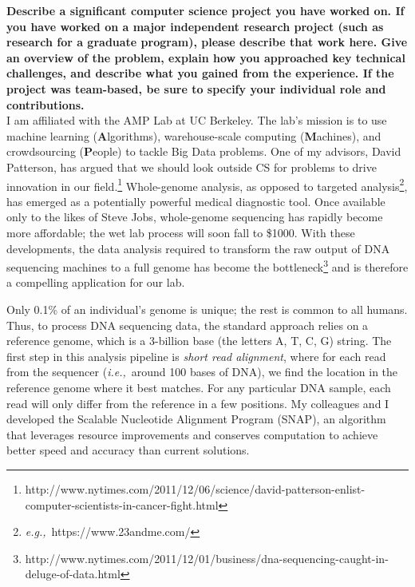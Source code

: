 \documentclass{article}
\newcommand{\ie}{{\em i.e.,}~}
\newcommand{\eg}{{\em e.g.,}~}
\begin{document}
	
\pagestyle{plain}

\textbf{Describe a significant computer science project you have worked on. If you have worked on a major independent research project (such as research for a graduate program), please describe that work here. Give an overview of the problem, explain how you approached key technical challenges, and describe what you gained from the experience. If the project was team-based, be sure to specify your individual role and contributions.}\\

I am affiliated with the AMP Lab at UC Berkeley.
The lab's mission is to use machine learning (\textbf{A}lgorithms), warehouse-scale computing (\textbf{M}achines), and crowdsourcing (\textbf{P}eople) to tackle Big Data problems.
One of my advisors, David Patterson, has argued that we should look outside CS for problems to drive innovation in our field.\footnote{http://www.nytimes.com/2011/12/06/science/david-patterson-enlist-computer-scientists-in-cancer-fight.html} %
Whole-genome analysis, as opposed to targeted analysis\footnote{\eg https://www.23andme.com/}, has emerged as a potentially powerful medical diagnostic tool.
Once available only to the likes of Steve Jobs, whole-genome sequencing has rapidly become more affordable; the wet lab process will soon fall to \$1000.
With these developments, the data analysis required to transform the raw output of DNA sequencing machines to a full genome has become the bottleneck\footnote{http://www.nytimes.com/2011/12/01/business/dna-sequencing-caught-in-deluge-of-data.html} and is therefore a compelling application for our lab.

Only 0.1\% of an individual's genome is unique; the rest is common to all humans.
Thus, to process DNA sequencing data, the standard approach relies on a reference genome, which is a 3-billion base (the letters A, T, C, G) string.
The first step in this analysis pipeline is \textit{short read alignment}, where for each read from the sequencer (\ie around 100 bases of DNA), we find the location in the reference genome where it best matches.
For any particular DNA sample, each read will only differ from the reference in a few positions.
My colleagues and I developed the Scalable Nucleotide Alignment Program (SNAP), an algorithm that leverages resource improvements and conserves computation to achieve better speed and accuracy than current solutions.
\end{document}
